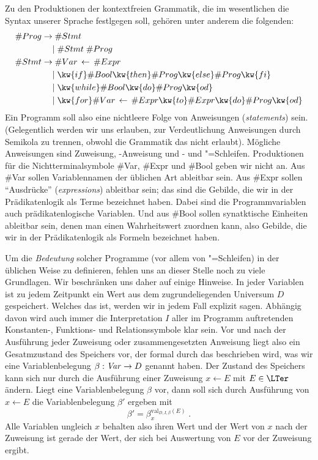 Zu den Produktionen der kontextfreien Grammatik, die im wesentlichen
die Syntax unserer Sprache festlgegen soll, gehören unter anderem die
folgenden:
\begin{align*}
  \#{Prog} \to &\;\#{Stmt} \\
               &|\; \#{Stmt} \; \#{Prog} \\
  \#{Stmt} \to &\;\#{Var} \,\gets\, \#{Expr} \\
               &|\; \kw{if } \#{Bool} \kw{ then } \#{Prog} \kw{ else } \#{Prog} \kw{ fi} \\
               &|\; \kw{while } \#{Bool} \kw{ do } \#{Prog} \kw{ od} \\
               &|\; \kw{for } \#{Var} \,\gets\, \#{Expr} \kw{ to } \#{Expr} \kw{ do } \#{Prog} \kw{ od}
\end{align*}
%
Ein Programm soll also eine nichtleere Folge von Anweisungen
(\emph{statements}) sein.
%
(Gelegentlich werden wir uns erlauben, zur Verdeutlichung Anweisungen
durch Semikola zu trennen, obwohl die Grammatik das nicht erlaubt).
%
Mögliche Anweisungen sind Zuweisung, -Anweisung und
- und "=Schleifen.
%
Produktionen für die Nichtterminalsymbole \#{Var}, \#{Expr} und
\#{Bool} geben wir nicht an.
%
Aus \#{Var} sollen Variablennamen der üblichen Art ableitbar sein.
%
Aus \#{Expr} sollen "`Ausdrücke"' (\emph{expressions}) ableitbar sein;
das sind die Gebilde, die wir in der Prädikatenlogik als Terme
bezeichnet haben.
%
Dabei sind die Programmvariablen auch prädikatenlogische Variablen.
%
Und aus \#{Bool} sollen synatktische Einheiten ableitbar sein, denen
man einen Wahrheitswert zuordnen kann, also Gebilde, die wir in der
Prädikatenlogik als Formeln bezeichnet haben.

Um die \emph{Bedeutung} solcher Programme (vor allem von
"=Schleifen) in der üblichen Weise zu definieren, fehlen uns
an dieser Stelle noch zu viele Grundlagen.
%
Wir beschränken uns daher auf einige Hinweise.
%
In jeder Variablen ist zu jedem Zeitpunkt ein Wert aus dem
zugrundeliegenden Universum $D$ gespeichert.
%
Welches das ist, werden wir in jedem Fall explizit sagen.
%
Abhängig davon wird auch immer die Interpretation $I$ aller im
Programm auftretenden Konstanten-, Funktions- und Relationssymbole
klar sein.
%
Vor und nach der Ausführung jeder Zuweisung oder zusammengesetzten
Anweisung liegt also ein Gesatmzustand des Speichers vor, der formal
durch das beschrieben wird, was wir eine Variablenbelegung
$\beta:\hbox{\textit{Var}} \to D$ genannt haben.
%
Der Zustand des Speichers kann sich nur durch die Ausführung einer
Zuweisung $x\gets E$ mit $E\in\LTer$ ändern.
%
Liegt eine Variablenbelegung $\beta$ vor, dann soll sich durch
Ausführung von $x\gets E$ die Variablenbelegung $\beta'$ ergeben mit
\[
  \beta' = \beta_x^{\mathrm{val}_{D,I,\beta}(E)} \;.
\]
Alle Variablen ungleich $x$ behalten also ihren Wert und der Wert von
$x$ nach der Zuweisung ist gerade der Wert, der sich bei Auswertung
von $E$ vor der Zuweisung ergibt.

